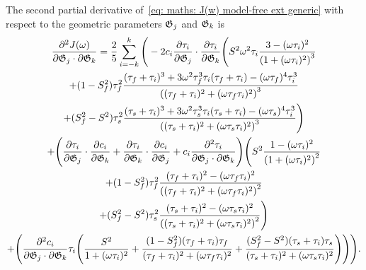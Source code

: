 The second partial derivative of~\eqref{eq: maths: J(w) model-free ext generic} with respect to the geometric parameters $\mathfrak{G}_j$ and $\mathfrak{G}_k$ is
\begin{multline}
    \frac{\partial^2 J(\omega)}{\partial \mathfrak{G}_j \cdot \partial \mathfrak{G}_k} = \frac{2}{5} \sum_{i=-k}^k \Bigg(
        -2 c_i \frac{\partial \tau_i}{\partial \mathfrak{G}_j} \cdot \frac{\partial \tau_i}{\partial \mathfrak{G}_k} \Bigg(
            S^2 \omega^2 \tau_i \frac{3 - (\omega \tau_i)^2}{\left(1 + (\omega \tau_i)^2 \right)^3}  \\
            + (1 - S^2_f) \tau_f^2 \frac{(\tau_f + \tau_i)^3  +  3 \omega^2 \tau_f^3 \tau_i (\tau_f + \tau_i)  -  (\omega \tau_f)^4 \tau_i^3}
                {\left((\tau_f + \tau_i)^2 + (\omega \tau_f \tau_i)^2 \right)^3} \\
            + (S^2_f - S^2) \tau_s^2 \frac{(\tau_s + \tau_i)^3  +  3 \omega^2 \tau_s^3 \tau_i (\tau_s + \tau_i)  -  (\omega \tau_s)^4 \tau_i^3}
                {\left((\tau_s + \tau_i)^2 + (\omega \tau_s \tau_i)^2 \right)^3}
        \Bigg) \\
        + \Bigg(
            \frac{\partial \tau_i}{\partial \mathfrak{G}_j} \cdot \frac{\partial c_i}{\partial \mathfrak{G}_k}
            + \frac{\partial \tau_i}{\partial \mathfrak{G}_k} \cdot \frac{\partial c_i}{\partial \mathfrak{G}_j}
            + c_i \frac{\partial^2 \tau_i}{\partial \mathfrak{G}_j \cdot \partial \mathfrak{G}_k}
        \Bigg)
        \Bigg(
            S^2 \frac{1 - (\omega \tau_i)^2}{\left(1 + (\omega \tau_i)^2 \right)^2} \\
            + (1 - S^2_f) \tau_f^2 \frac{(\tau_f + \tau_i)^2 - (\omega \tau_f \tau_i)^2}{\left((\tau_f + \tau_i)^2 + (\omega \tau_f \tau_i)^2 \right)^2} \\
            + (S^2_f - S^2) \tau_s^2 \frac{(\tau_s + \tau_i)^2 - (\omega \tau_s \tau_i)^2}{\left((\tau_s + \tau_i)^2 + (\omega \tau_s \tau_i)^2 \right)^2}
        \Bigg) \\
        + \Bigg(
            \frac{\partial^2 c_i}{\partial \mathfrak{G}_j \cdot \partial \mathfrak{G}_k} \tau_i \Bigg(
                \frac{S^2}{1 + (\omega \tau_i)^2}
                + \frac{(1 - S^2_f)(\tau_f + \tau_i)\tau_f}{(\tau_f + \tau_i)^2 + (\omega \tau_f \tau_i)^2}
                + \frac{(S^2_f - S^2)(\tau_s + \tau_i)\tau_s}{(\tau_s + \tau_i)^2 + (\omega \tau_s \tau_i)^2}
            \Bigg)
        \Bigg)
    \Bigg).
\end{multline}
                


